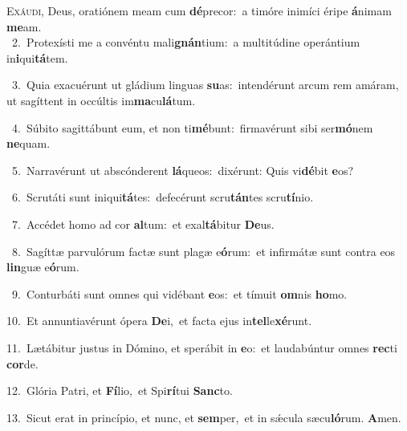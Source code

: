 \lettrine{\initial\textcolor{\initialcolor}{E}}{xáudi,} Deus, oratiónem meam cum \textbf{dé}\-precor:~\star a timóre inimíci éripe \textbf{á}\-nimam \textbf{me}\-am.\\
{\numbfont\textcolor{\numbcolor}{~2.}}~Protexísti me a convéntu mali\-\textbf{gnán}\-tium:~\star a multitúdine operántium in\-\textbf{i}\-qui\-\textbf{tá}\-tem.\par
{\numbfont\textcolor{\numbcolor}{~3.}}~Quia exacuérunt ut gládium linguas \textbf{su}\-as:~\star intendérunt arcum rem amáram, ut sagíttent in occúltis im\-\textbf{ma}\-cu\-\textbf{lá}\-tum.\par
{\numbfont\textcolor{\numbcolor}{~4.}}~Súbito sagittábunt eum, et non ti\-\textbf{mé}\-bunt:~\star firmavérunt sibi ser\-\textbf{mó}\-nem \textbf{ne}\-quam.\par
{\numbfont\textcolor{\numbcolor}{~5.}}~Narravérunt ut abscónderent \textbf{lá}\-queos:~\star dixérunt: Quis vi\-\textbf{dé}\-bit \textbf{e}\-os?\par
{\numbfont\textcolor{\numbcolor}{~6.}}~Scrutáti sunt iniqui\-\textbf{tá}\-tes:~\star defecérunt scru\-\textbf{tán}\-tes scru\-\textbf{tí}\-nio.\par
{\numbfont\textcolor{\numbcolor}{~7.}}~Accédet homo ad cor \textbf{al}\-tum:~\star et exal\-\textbf{tá}\-bitur \textbf{De}\-us.\par
{\numbfont\textcolor{\numbcolor}{~8.}}~Sagíttæ parvulórum factæ sunt plagæ e\-\textbf{ó}\-rum:~\star et infirmátæ sunt contra eos \textbf{lin}\-guæ e\-\textbf{ó}\-rum.\par
{\numbfont\textcolor{\numbcolor}{~9.}}~Conturbáti sunt omnes qui vidébant \textbf{e}\-os:~\star et tímuit \textbf{om}\-nis \textbf{ho}\-mo.\par
{\numbfont\textcolor{\numbcolor}{10.}}~Et annuntiavérunt ópera \textbf{De}\-i,~\star et facta ejus in\-\textbf{tel}\-le\-\textbf{xé}\-runt.\par
{\numbfont\textcolor{\numbcolor}{11.}}~Lætábitur justus in Dómino, et sperábit in \textbf{e}\-o:~\star et laudabúntur omnes \textbf{rec}\-ti \textbf{cor}\-de.\par
{\numbfont\textcolor{\numbcolor}{12.}}~Glória Patri, et \textbf{Fí}\-lio,~\star et Spi\-\textbf{rí}\-tui \textbf{Sanc}\-to.\par
{\numbfont\textcolor{\numbcolor}{13.}}~Sicut erat in princípio, et nunc, et \textbf{sem}\-per,~\star et in sǽcula sæcu\-\textbf{ló}\-rum. \textbf{A}\-men.\par
